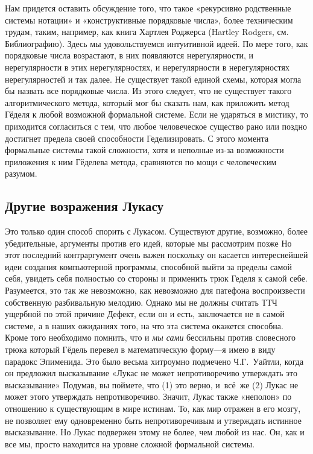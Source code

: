 \documentclass[../main.tex]{subfiles}
\begin{document}
Нам придется оставить обсуждение того, что такое «рекурсивно родственные системы нотации» и «конструктивные порядковые числа», более техническим трудам, таким, например, как книга Хартлея Роджерса (Hartley Rodgers, см. Библиографию). Здесь мы удовольствуемся интуитивной идеей. По мере того, как порядковые числа возрастают, в них появляются нерегулярности, и нерегулярности в этих нерегулярностях, и нерегулярности в нерегулярностях нерегулярностей и так далее. Не существует такой единой схемы, которая могла бы назвать все порядковые числа. Из этого следует, что не существует такого алгоритмического метода, который мог бы сказать нам, как приложить метод Гёделя к любой возможной формальной системе. Если не ударяться в мистику, то приходится согласиться с тем, что любое человеческое существо рано или поздно достигнет предела своей способности Геделизировать. С этого момента формальные системы такой сложности, хотя и неполные из-за возможности приложения к ним Гёделева метода, сравняются по мощи с человеческим разумом.


\subsection{Другие возражения Лукасу}

Это только один способ спорить с Лукасом. Существуют другие, возможно, более убедительные, аргументы против его идей, которые мы рассмотрим позже Но этот последний контраргумент очень важен поскольку он касается интереснейшей идеи создания компьютерной программы, способной выйти за пределы самой себя, увидеть себя полностью со стороны и применить трюк Геделя к самой себе. Разумеется, это так же невозможно, как невозможно для патефона воспроизвести собственную разбивальную мелодию. Однако мы не должны считать ТТЧ ущербной по этой причине Дефект, если он и есть, заключается не в самой системе, а в наших ожиданиях того, на что эта система окажется способна. Кроме того необходимо помнить, что и \emph{мы сами} бессильны против словесного трюка который Гёдель перевел в математическую форму---я имею в виду парадокс Эпименида. Это было весьма хитроумно подмечено Ч.Г.~Уайтли, когда он предложил высказывание «Лукас не может непротиворечиво утверждать это высказывание» Подумав, вы поймете, что (1) это верно, и~всё~же (2) Лукас не может этого утверждать непротиворечиво. Значит, Лукас также «неполон» по отношению к существующим в мире истинам. То, как мир отражен в его мозгу, не позволяет ему одновременно быть непротиворечивым и утверждать истинное высказывание. Но Лукас подвержен этому не более, чем любой из нас. Он, как и все мы, просто находится на уровне сложной формальной системы.
\end{document}
